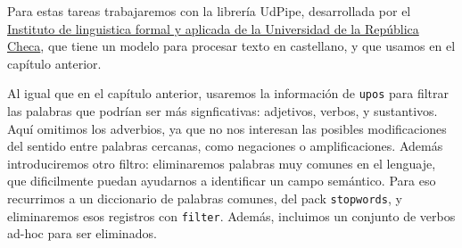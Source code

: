 \documentclass[
]{book}
\newenvironment{Shaded}{\begin{snugshade}}{\end{snugshade}}
\newcommand{\AttributeTok}[1]{\textcolor[rgb]{0.77,0.63,0.00}{#1}}
\newcommand{\CommentTok}[1]{\textcolor[rgb]{0.56,0.35,0.01}{\textit{#1}}}
\newcommand{\DecValTok}[1]{\textcolor[rgb]{0.00,0.00,0.81}{#1}}
\newcommand{\FunctionTok}[1]{\textcolor[rgb]{0.00,0.00,0.00}{#1}}
\newcommand{\NormalTok}[1]{#1}
\newcommand{\OtherTok}[1]{\textcolor[rgb]{0.56,0.35,0.01}{#1}}
\newcommand{\SpecialCharTok}[1]{\textcolor[rgb]{0.00,0.00,0.00}{#1}}
\newcommand{\StringTok}[1]{\textcolor[rgb]{0.31,0.60,0.02}{#1}}
\begin{document}
Para estas tareas trabajaremos con la librería UdPipe, desarrollada por el \href{https://ufal.mff.cuni.cz/udpipe}{Instituto de linguistica formal y aplicada de la Universidad de la República Checa}, que tiene un modelo para procesar texto en castellano, y que usamos en el capítulo anterior.

\begin{Shaded}
\end{Shaded}

\begin{Shaded}
\end{Shaded}

Al igual que en el capítulo anterior, usaremos la información de \texttt{upos} para filtrar las palabras que podrían ser más signficativas: adjetivos, verbos, y sustantivos.
Aquí omitimos los adverbios, ya que no nos interesan las posibles modificaciones del sentido entre palabras cercanas, como negaciones o amplificaciones.
Además introduciremos otro filtro: eliminaremos palabras muy comunes en el lenguaje, que dificilmente puedan ayudarnos a identificar un campo semántico. Para eso recurrimos a un diccionario de palabras comunes, del pack \texttt{stopwords}, y eliminaremos esos registros con \texttt{filter}. Además, incluimos un conjunto de verbos ad-hoc para ser eliminados.
\end{document}
